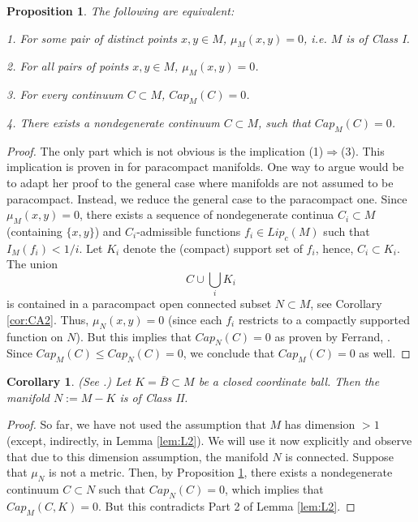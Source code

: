 \documentclass[11pt]{article}   	%
\newtheorem{prop}[thm]{Proposition}
\newtheorem{cor}[thm]{Corollary}
\begin{document}
\begin{prop}\label{prop:P1}
The following are equivalent:

1. For some pair of distinct points $x, y\in M$, $\mu_M(x,y)=0$, i.e. $M$ is of Class I. 

2. For all pairs of points $x, y\in M$, $\mu_M(x,y)=0$. 

3. For every continuum $C\subset M$, $Cap_M(C)=0$. 

4. There exists a nondegenerate continuum $C\subset M$, such that $Cap_M(C)=0$. 
\end{prop}
\begin{proof} The only part which is not obvious is the implication (1)$\Rightarrow$(3). This implication is proven in \cite[(6.8)]{Ferrand} for paracompact manifolds. 
One way to argue would be to adapt her proof to the general case where manifolds are not assumed to be paracompact. 
Instead, we reduce the general case to the paracompact one. Since 
$\mu_M(x,y)=0$, there exists a sequence of nondegenerate continua $C_i\subset M$ (containing $\{x,y\}$) and 
$C_i$-admissible functions $f_i\in Lip_c(M)$ such that $I_M(f_i)< 1/i$. Let $K_i$ denote 
the (compact) support set of $f_i$, hence, $C_i\subset K_i$. The union
$$
C\cup \bigcup_i K_i 
$$ 
is contained in a paracompact open connected subset $N\subset M$, see Corollary \ref{cor:CA2}. 
Thus, $\mu_N(x,y)=0$ (since each $f_i$ restricts to a compactly supported function on $N$). 
But this implies that $Cap_N(C)=0$ as proven by Ferrand,   
\cite[(6.8)]{Ferrand}. Since $Cap_M(C)\le Cap_N(C)=0$, we conclude that $Cap_M(C)=0$ as well. 
\end{proof}

\begin{cor}\label{cor:C1}
(See \cite[Example 6.9(b)]{Ferrand}.) Let $K=\bar{B}\subset M$ be a closed coordinate ball. Then the manifold $N:= M- K$ is of Class II. 
\end{cor}
\begin{proof} So far, we have not used the assumption that $M$ has dimension $>1$ (except, indirectly, in Lemma \ref{lem:L2}). 
We will use it now explicitly and observe that due to this dimension assumption, 
the manifold $N$ is connected. Suppose that $\mu_N$ is not a metric. Then, by Proposition \ref{prop:P1}, there exists a nondegenerate 
continuum $C\subset N$ such that $Cap_N(C)=0$, which implies that 
$Cap_M(C, K)=0$. But this contradicts Part 2 of Lemma \ref{lem:L2}. 
\end{proof}
\end{document}
